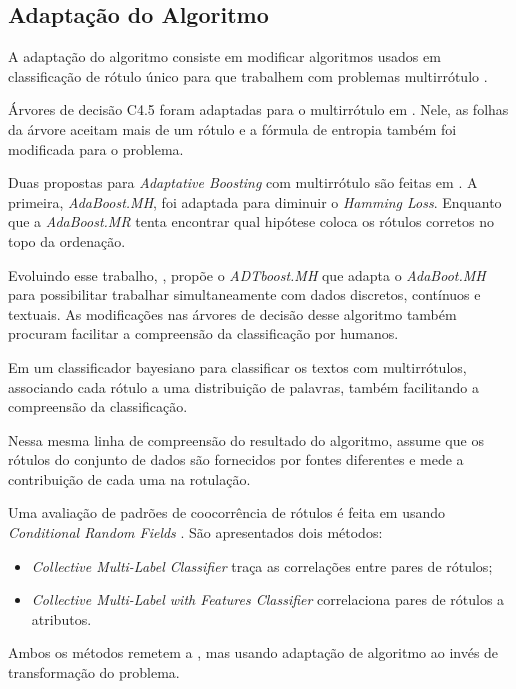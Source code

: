 \documentclass[runningheads,a4paper]{llncs}
\begin{document}
\subsection{Adaptação do Algoritmo}\label{subsec:adaptacao}

A adaptação do algoritmo consiste em modificar algoritmos usados em classificação de rótulo único para que trabalhem com problemas multirrótulo \cite{Tsoumakas2007-cw}.

Árvores de decisão C4.5 foram adaptadas para o multirrótulo em \cite{Clare2001-tq}. Nele, as folhas da árvore aceitam mais de um rótulo e a fórmula de entropia também foi modificada para o problema.

Duas propostas para \textit{Adaptative Boosting} com multirrótulo são feitas em \cite{Schapire2000-yt}. A primeira, \textit{AdaBoost.MH}, foi adaptada para diminuir o \textit{Hamming Loss}. Enquanto que a \textit{AdaBoost.MR} tenta encontrar qual hipótese coloca os rótulos corretos no topo da ordenação.

Evoluindo esse trabalho, \cite{De_Comite2003-lg}, propõe o \textit{ADTboost.MH} que adapta o \textit{AdaBoot.MH} para possibilitar trabalhar simultaneamente com dados discretos, contínuos e textuais. As modificações nas árvores de decisão desse algoritmo também procuram facilitar a compreensão da classificação por humanos.

Em \cite{McCallum1999-iz} um classificador bayesiano para classificar os textos com multirrótulos, associando cada rótulo a uma distribuição de palavras, também facilitando a compreensão da classificação.

Nessa mesma linha de compreensão do resultado do algoritmo, \cite{Streich2008-vu} assume que os rótulos do conjunto de dados são fornecidos por fontes diferentes e mede a contribuição de cada uma na rotulação.

Uma avaliação de padrões de coocorrência de rótulos é feita em \cite{Ghamrawi2005-fw} usando \textit{Conditional Random Fields} \cite{Lafferty2001-ov}. São apresentados dois métodos: 

\begin{itemize}
	\item \textit{Collective Multi-Label Classifier} traça as correlações entre pares de rótulos;
	\item \textit{Collective Multi-Label with Features Classifier} correlaciona pares de rótulos a atributos.	
\end{itemize}

Ambos os métodos remetem a \cite{Hullermeier2008-co}, mas usando adaptação de algoritmo ao invés de transformação do problema.
\end{document}
